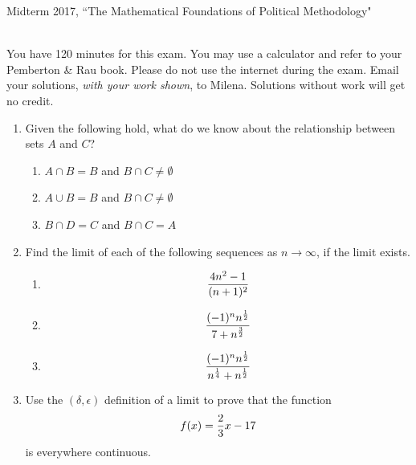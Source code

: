 \documentclass[11pt]{article}
\begin{document}
\noindent \large Midterm 2017, ``The Mathematical Foundations of Political Methodology"

\normalsize
\ \\You have 120 minutes for this exam.  You may use a calculator and refer to your Pemberton \& Rau book.  Please do not use the internet during the exam.  Email your solutions, \textit{with your work shown}, to Milena.  Solutions without work will get no credit.

\begin{enumerate}

\item Given the following hold, what do we know about the relationship between sets $A$ and $C$?

\begin{enumerate}
\item $A\cap B= B$ and $B\cap C\not=\emptyset$
\item $A\cup B= B$ and $B\cap C\not=\emptyset$
\item $B \cap D=C$ and $B\cap C=A$

\end{enumerate}

\vspace{.2in}

\item Find the limit of each of the following sequences as $n\rightarrow \infty$, if the limit exists.
\begin{enumerate}
\item $${{4n^2-1}\over{(n+1)^2}}$$
\item $${{(-1)^n n^{1\over 2}}\over{7+n^{3\over 2}}}$$
\item $${{(-1)^n n^{1\over 2}}\over{n^{1\over 4}+n^{1\over 2}}}$$
\end{enumerate}

\vspace{.2in}

\item Use the $(\delta, \epsilon)$ definition of a limit to prove that the function $$f(x)={2\over 3}x-17$$ is everywhere continuous.



\end{enumerate}
\end{document}
